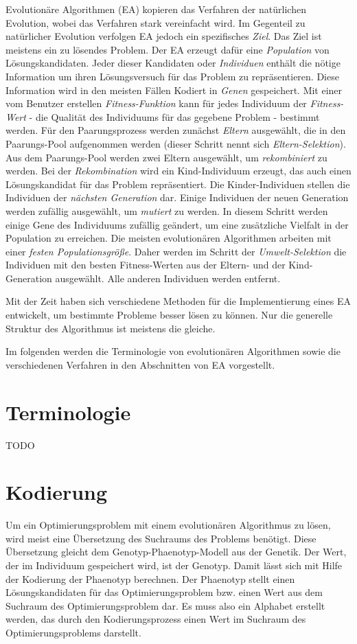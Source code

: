 Evolutionäre Algorithmen (EA) kopieren das Verfahren der natürlichen Evolution, wobei das Verfahren stark vereinfacht wird. Im Gegenteil zu natürlicher Evolution verfolgen EA jedoch ein spezifisches \textit{Ziel}. Das Ziel ist meistens ein zu lösendes Problem. Der EA erzeugt dafür eine \textit{Population} von Lösungskandidaten. Jeder dieser Kandidaten oder \textit{Individuen} enthält die nötige Information um ihren Lösungsversuch für das Problem zu repräsentieren. Diese Information wird in den meisten Fällen Kodiert in \textit{Genen} gespeichert. Mit einer vom Benutzer erstellen \textit{Fitness-Funktion} kann für jedes Individuum der \textit{Fitness-Wert} - die Qualität des Individuums für das gegebene Problem - bestimmt werden. Für den Paarungsprozess werden zunächst \textit{Eltern} ausgewählt, die in den Paarungs-Pool aufgenommen werden (dieser Schritt nennt sich \textit{Eltern-Selektion}). Aus dem Paarungs-Pool werden zwei Eltern ausgewählt, um \textit{rekombiniert} zu werden. Bei der \textit{Rekombination} wird ein Kind-Individuum erzeugt, das auch einen Lösungskandidat für das Problem repräsentiert. Die Kinder-Individuen stellen die Individuen der \textit{nächsten Generation} dar. Einige Individuen der neuen Generation werden zufällig ausgewählt, um \textit{mutiert} zu werden. In diesem Schritt werden einige Gene des Individuums zufällig geändert, um eine zusätzliche Vielfalt in der Population zu erreichen. Die meisten evolutionären Algorithmen arbeiten mit einer \textit{festen Populationsgröße}. Daher werden im Schritt der \textit{Umwelt-Selektion} die Individuen mit den besten Fitness-Werten aus der Eltern- und der Kind-Generation ausgewählt. Alle anderen Individuen werden entfernt. 

Mit der Zeit haben sich verschiedene Methoden für die Implementierung eines EA entwickelt, um bestimmte Probleme besser lösen zu können. Nur die generelle Struktur des Algorithmus ist meistens die gleiche. %

Im folgenden werden die Terminologie von evolutionären Algorithmen sowie die verschiedenen Verfahren in den Abschnitten von EA vorgestellt. 

\section{Terminologie}
TODO

\section{Kodierung}
Um ein Optimierungsproblem mit einem evolutionären Algorithmus zu lösen, wird meist eine Übersetzung des Suchraums des Problems benötigt. Diese Übersetzung gleicht dem Genotyp-Phaenotyp-Modell aus der Genetik. Der Wert, der im Individuum gespeichert wird, ist der Genotyp. Damit lässt sich mit Hilfe der Kodierung der Phaenotyp berechnen. Der Phaenotyp stellt einen Lösungskandidaten für das Optimierungsproblem bzw. einen Wert aus dem Suchraum des Optimierungsproblem dar. Es muss also ein Alphabet erstellt werden, das durch den Kodierungsprozess einen Wert im Suchraum des Optimierungsproblems darstellt. 

